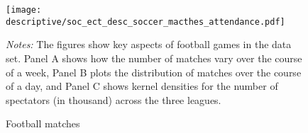 \begin{figure}[H]\centering
	\caption{Football matches}\label{fig_soc_ext:descriptives_matches_time_attendance}
	\texttt{[image: descriptive/soc\_ect\_desc\_soccer\_macthes\_attendance.pdf]}	
	\begin{minipage}{0.9\linewidth}
		\scriptsize{\emph{Notes:} The figures show key aspects of football games in the data set. Panel A shows how the number of matches vary over the course of a week, Panel B plots the distribution of matches over the course of a day, and Panel C shows kernel densities for the number of spectators (in thousand) across the three leagues.}
	\end{minipage}
\end{figure}